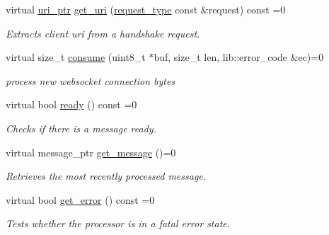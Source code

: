 \begin{DoxyCompactItemize}
\mbox{\label{classwebsocketpp_1_1processor_1_1processor_a8c47ebd7cbf55544b8bc4178dd97a140}} 
virtual \mbox{\hyperlink{namespacewebsocketpp_aae370ea5ac83a8ece7712cb39fc23f5b}{uri\+\_\+ptr}} \mbox{\hyperlink{classwebsocketpp_1_1processor_1_1processor_a8c47ebd7cbf55544b8bc4178dd97a140}{get\+\_\+uri}} (\mbox{\hyperlink{classwebsocketpp_1_1http_1_1parser_1_1request}{request\+\_\+type}} const \&request) const =0
\begin{DoxyCompactList}\small\item\em Extracts client uri from a handshake request. \end{DoxyCompactList}\item 
virtual size\+\_\+t \mbox{\hyperlink{classwebsocketpp_1_1processor_1_1processor_a14cb7ee9cd5fa60353ba198f1d3d06c5}{consume}} (uint8\+\_\+t $\ast$buf, size\+\_\+t len, lib\+::error\+\_\+code \&ec)=0
\begin{DoxyCompactList}\small\item\em process new websocket connection bytes \end{DoxyCompactList}\item 
virtual bool \mbox{\hyperlink{classwebsocketpp_1_1processor_1_1processor_a623344489598696c98cecebb03c18333}{ready}} () const =0
\begin{DoxyCompactList}\small\item\em Checks if there is a message ready. \end{DoxyCompactList}\item 
virtual message\+\_\+ptr \mbox{\hyperlink{classwebsocketpp_1_1processor_1_1processor_afb9477aa9e49a7dca59d684277b66932}{get\+\_\+message}} ()=0
\begin{DoxyCompactList}\small\item\em Retrieves the most recently processed message. \end{DoxyCompactList}\item 
\mbox{\label{classwebsocketpp_1_1processor_1_1processor_ac3767ec87d3d538c429156295edd5144}} 
virtual bool \mbox{\hyperlink{classwebsocketpp_1_1processor_1_1processor_ac3767ec87d3d538c429156295edd5144}{get\+\_\+error}} () const =0
\begin{DoxyCompactList}\small\item\em Tests whether the processor is in a fatal error state. \end{DoxyCompactList}\item 

\end{DoxyCompactItemize}
